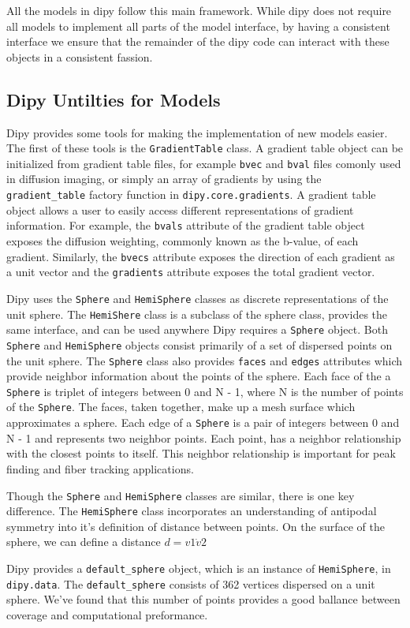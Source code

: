 All the models in dipy follow this main framework. While dipy does not require all models to implement all parts of the model interface, by having a consistent interface we ensure that the remainder of the dipy code can interact with these objects in a consistent fassion.

\subsection{Dipy Untilties for Models}
Dipy provides some tools for making the implementation of new models easier. The first of these tools is the \verb|GradientTable| class. A gradient table object can be initialized from gradient table files, for example \verb|bvec| and \verb|bval| files comonly used in diffusion imaging, or simply an array of gradients by using the \verb|gradient_table| factory function in \verb|dipy.core.gradients|. A gradient table object allows a user to easily access different representations of gradient information. For example, the \verb|bvals| attribute of the gradient table object exposes the diffusion weighting, commonly known as the b-value, of each gradient. Similarly, the \verb|bvecs| attribute exposes the direction of each gradient as a unit vector and the \verb|gradients| attribute exposes the total gradient vector.

Dipy uses the \verb|Sphere| and \verb|HemiSphere| classes as discrete representations of the unit sphere. The \verb|HemiShere| class is a subclass of the sphere class, provides the same interface, and can be used anywhere Dipy requires a \verb|Sphere| object.  Both \verb|Sphere| and \verb|HemiSphere| objects consist primarily of a set of dispersed points on the unit sphere. The \verb|Sphere| class also provides \verb|faces| and \verb|edges| attributes which provide neighbor information about the points of the sphere. Each face of the a \verb|Sphere| is triplet of integers between 0 and N - 1, where N is the number of points of the \verb|Sphere|. The faces, taken together, make up a mesh surface which approximates a sphere. Each edge of a \verb|Sphere| is a pair of integers between 0 and N - 1 and represents two neighbor points. Each point, has a neighbor relationship with the closest points to itself. This neighbor relationship is important for peak finding and fiber tracking applications.

Though the \verb|Sphere| and \verb|HemiSphere| classes are similar, there is one key difference. The \verb|HemiSphere| class incorporates an understanding of antipodal symmetry into it's definition of distance between points. On the surface of the sphere, we can define a distance $d = v1 \dot v2$ 

Dipy provides a \verb|default_sphere| object, which is an instance of \verb|HemiSphere|, in \verb|dipy.data|. The \verb|default_sphere| consists of 362 vertices dispersed on a unit sphere. We've found that this number of points provides a good ballance between coverage and computational preformance.
